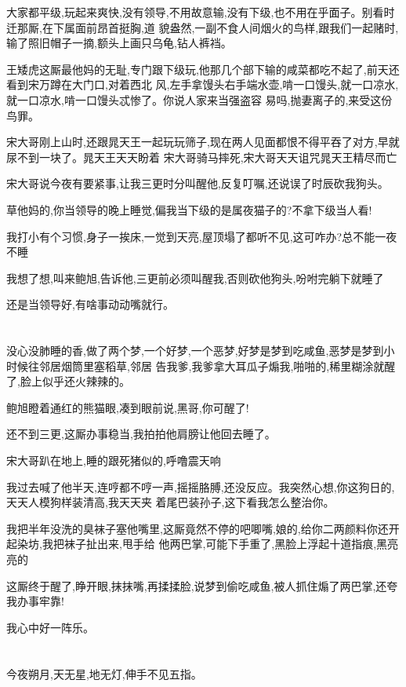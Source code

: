 ﻿\documentclass[12pt]{article}
\begin{document}
大家都平级,玩起来爽快,没有领导,不用故意输,没有下级,也不用在乎面子。别看时迁那厮,在下属面前昂首挺胸,道
貌盎然,一副不食人间烟火的鸟样,跟我们一起赌时,输了照旧帽子一摘,额头上画只乌龟,钻人裤裆。

王矮虎这厮最他妈的无耻,专门跟下级玩,他那几个部下输的咸菜都吃不起了,前天还看到宋万蹲在大门口,对着西北
风,左手拿馒头右手端水壶,啃一口馒头,就一口凉水,就一口凉水,啃一口馒头\dldots 忒惨了。你说人家来当强盗容
易吗,抛妻离子的,来受这份鸟罪。

宋大哥刚上山时,还跟晁天王一起玩玩筛子,现在两人见面都恨不得平吞了对方,早就尿不到一块了。晁天王天天盼着
宋大哥骑马摔死,宋大哥天天诅咒晁天王精尽而亡\dldots

宋大哥说今夜有要紧事,让我三更时分叫醒他,反复叮嘱,还说误了时辰砍我狗头。

草他妈的,你当领导的晚上睡觉,偏我当下级的是属夜猫子的?不拿下级当人看!

我打小有个习惯,身子一挨床,一觉到天亮,屋顶塌了都听不见,这可咋办?总不能一夜不睡

我想了想,叫来鲍旭,告诉他,三更前必须叫醒我,否则砍他狗头,吩咐完躺下就睡了

还是当领导好,有啥事动动嘴就行。
\section{}

没心没肺睡的香,做了两个梦,一个好梦,一个恶梦,好梦是梦到吃咸鱼,恶梦是梦到小时候往邻居烟筒里塞稻草,邻居
告我爹,我爹拿大耳瓜子煽我,啪啪的,稀里糊涂就醒了,脸上似乎还火辣辣的。

鲍旭瞪着通红的熊猫眼,凑到眼前说,黑哥,你可醒了!

还不到三更,这厮办事稳当,我拍拍他肩膀让他回去睡了。

宋大哥趴在地上,睡的跟死猪似的,呼噜震天响

我过去喊了他半天,连哼都不哼一声,摇摇胳膊,还没反应。我突然心想,你这狗日的,天天人模狗样装清高,我天天夹
着尾巴装孙子,这下看我怎么整治你。

我把半年没洗的臭袜子塞他嘴里,这厮竟然不停的吧唧嘴,娘的,给你二两颜料你还开起染坊,我把袜子扯出来,甩手给
他两巴掌,可能下手重了,黑脸上浮起十道指痕,黑亮亮的

这厮终于醒了,睁开眼,抹抹嘴,再揉揉脸,说梦到偷吃咸鱼,被人抓住煽了两巴掌,还夸我办事牢靠!

我心中好一阵乐。
\section{}

今夜朔月,天无星,地无灯,伸手不见五指。
\end{document}
